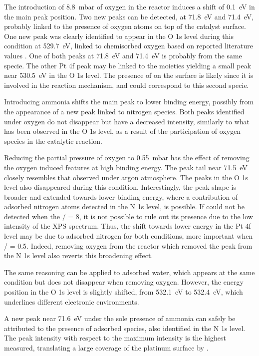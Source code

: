 The introduction of \qty{8.8}{\milli\bar} of oxygen in the reactor induces a shift of \qty{0.1}{\eV} in the main peak position.
Two new peaks can be detected, at \qty{71.8}{\eV} and \qty{71.4}{\eV}, probably linked to the presence of oxygen atoms on top of the catalyst surface.
One new peak was clearly identified to appear in the O 1s level during this condition at \qty{529.7}{\eV}, linked to chemisorbed oxygen based on reported literature values \parencite{Rienks2003, Kondratenko2006}.
One of both peaks at \qty{71.8}{\eV} and \qty{71.4}{\eV} is probably from the same specie.
The other Pt 4f peak may be linked to the moieties yielding a small peak near \qty{530.5}{\eV} in the O 1s level.
The presence of  on the surface is likely since it is involved in the reaction mechanism, and could correspond to this second specie.

Introducing ammonia shifts the main peak to lower binding energy, possibly from the appearance of a new peak linked to nitrogen species.
Both peaks identified under oxygen do not disappear but have a decreased intensity, similarly to what has been observed in the O 1s level, as a result of the participation of oxygen species in the catalytic reaction.

Reducing the partial pressure of oxygen to \qty{0.55}{\milli\bar} has the effect of removing the oxygen induced features at high binding energy.
The peak tail near \qty{71.5}{\eV} closely resembles that observed under argon atmosphere.
The  peaks in the O 1s level also disappeared during this condition.
Interestingly, the peak shape is broader and extended towards lower binding energy, where a contribution of adsorbed nitrogen atoms detected in the N 1s level, is possible.
If  could not be detected when the / = 8, it is not possible to rule out its presence due to the low intensity of the XPS spectrum.
Thus, the shift towards lower energy in the Pt 4f level may be due to adsorbed nitrogen for both conditions, more important when / = 0.5.
Indeed, removing oxygen from the reactor which removed the  peak from the N 1s level also reverts this broadening effect.

The same reasoning can be applied to adsorbed water, which appears at the same condition but does not disappear when removing oxygen.
However, the energy position in the O 1s level is slightly shifted, from \qty{532.1}{\eV} to \qty{532.4}{\eV}, which underlines different electronic environments.

A new peak near \qty{71.6}{\eV} under the sole presence of ammonia can safely be attributed to the presence of adsorbed  species, also identified in the N 1s level.
The peak intensity with respect to the maximum intensity is the highest measured, translating a large coverage of the platinum surface by .

